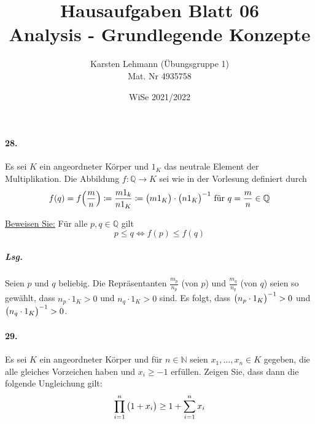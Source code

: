 \documentclass{scrreprt}
\author{Karsten Lehmann (Übungsgruppe 1)\\Mat. Nr 4935758}
\date{WiSe 2021/2022}
\title{Hausaufgaben Blatt 06\\Analysis - Grundlegende Konzepte}
\begin{document}
\paragraph{28.} Es sei $K$ ein angeordneter Körper und $1_K$ das neutrale Element
der Multiplikation.
Die Abbildung $f \colon \mathbb{Q} \to K$ sei wie in der Vorlesung definiert
durch
\[
  f(q) = f\qty(\frac{m}{n}) \coloneqq \frac{m1_k}{n1_K} \coloneqq
  \qty\big(m1_K) \cdot \qty\big(n1_K)^{-1}
  \text{ für } q = \frac{m}{n} \in \mathbb{Q}
\]

\underline{Beweisen Sie:} Für alle $p, q \in \mathbb{Q}$ gilt
\[
  p \leq q \iff f(p) \leq f(q)
\]

\subparagraph{Lsg.} Seien $p$ und $q$ beliebig.
Die Repräsentanten $\frac{m_p}{n_p}$ (von $p$) und $\frac{m_q}{n_q}$ (von $q$)
seien so gewählt, dass $n_p \cdot 1_K > 0$ und $n_q \cdot 1_K > 0$ sind.
Es folgt, dass $\qty\big(n_p \cdot 1_K)^{-1} > 0$ und
$\qty\big(n_q \cdot 1_K)^{-1} > 0$.


\paragraph{29.} Es sei $K$ ein angeordneter Körper und für $n \in \mathbb{N}$
seien $x_1, \ldots, x_n \in K$ gegeben, die alle gleiches Vorzeichen haben und
$x_i \geq -1$ erfüllen.
Zeigen Sie, dass dann die folgende Ungleichung gilt:
\[
  \prod_{i = 1}^n \qty\big(1 + x_i) \geq 1 + \sum_{i = 1}^n x_i
\]
\end{document}
